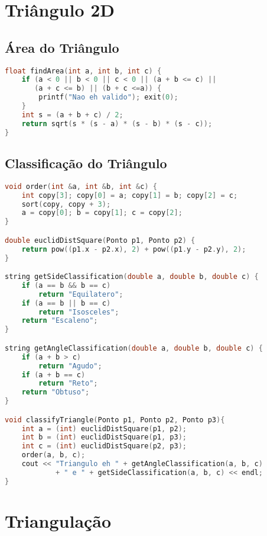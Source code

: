 \newpage

\section{Triângulo 2D}
\subsection*{Área do Triângulo}
\begin{lstlisting}[language=C++]
float findArea(int a, int b, int c) {
	if (a < 0 || b < 0 || c < 0 || (a + b <= c) ||
       (a + c <= b) || (b + c <=a)) {
    	printf("Nao eh valido"); exit(0);
    }
    int s = (a + b + c) / 2;
    return sqrt(s * (s - a) * (s - b) * (s - c));
}
\end{lstlisting}

\subsection*{Classificação do Triângulo}
\begin{lstlisting}[language=C++]
void order(int &a, int &b, int &c) {
	int copy[3]; copy[0] = a; copy[1] = b; copy[2] = c;
	sort(copy, copy + 3);
    a = copy[0]; b = copy[1]; c = copy[2];
}

double euclidDistSquare(Ponto p1, Ponto p2) {
	return pow((p1.x - p2.x), 2) + pow((p1.y - p2.y), 2);
}

string getSideClassification(double a, double b, double c) {
	if (a == b && b == c)
		return "Equilatero";
	if (a == b || b == c)
		return "Isosceles";
	return "Escaleno";
}

string getAngleClassification(double a, double b, double c) {
	if (a + b > c)
		return "Agudo";
	if (a + b == c)
    	return "Reto";
    return "Obtuso";
}

void classifyTriangle(Ponto p1, Ponto p2, Ponto p3){ 
	int a = (int) euclidDistSquare(p1, p2);
	int b = (int) euclidDistSquare(p1, p3);
	int c = (int) euclidDistSquare(p2, p3);
	order(a, b, c);
	cout << "Triangulo eh " + getAngleClassification(a, b, c) 
    		+ " e " + getSideClassification(a, b, c) << endl;
}
\end{lstlisting}

\section{Triangulação}
